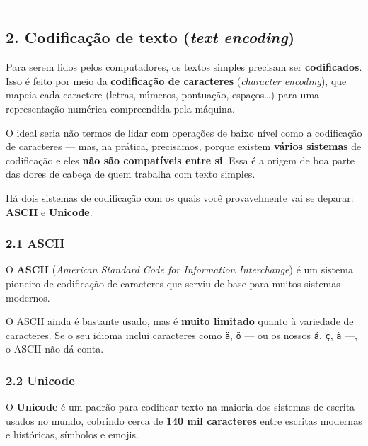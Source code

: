 \documentclass[
  brazilian,
  11pt,
]{article}
\let\oldtexttt\texttt
\renewcommand{\texttt}[1]{{\color{inlink}\oldtexttt{#1}}}
\begin{document}
\begin{center}\rule{0.5\linewidth}{0.5pt}\end{center}

\subsection{\texorpdfstring{2. Codificação de texto (\emph{text
encoding})}{2. Codificação de texto (text encoding)}}\label{codificauxe7uxe3o-de-texto-text-encoding}

Para serem lidos pelos computadores, os textos simples precisam ser
\textbf{codificados}. Isso é feito por meio da \textbf{codificação de
caracteres} (\emph{character encoding}), que mapeia cada caractere
(letras, números, pontuação, espaços\ldots) para uma representação
numérica compreendida pela máquina.

O ideal seria não termos de lidar com operações de baixo nível como a
codificação de caracteres --- mas, na prática, precisamos, porque
existem \textbf{vários sistemas} de codificação e eles \textbf{não são
compatíveis entre si}. Essa é a origem de boa parte das dores de cabeça
de quem trabalha com texto simples.

Há dois sistemas de codificação com os quais você provavelmente vai se
deparar: \textbf{ASCII} e \textbf{Unicode}.

\subsubsection{2.1 ASCII}\label{ascii}

O \textbf{ASCII} (\emph{American Standard Code for Information
Interchange}) é um sistema pioneiro de codificação de caracteres que
serviu de base para muitos sistemas modernos.

O ASCII ainda é bastante usado, mas é \textbf{muito limitado} quanto à
variedade de caracteres. Se o seu idioma inclui caracteres como
\texttt{ä}, \texttt{ö} --- ou os nossos \texttt{á}, \texttt{ç},
\texttt{ã} ---, o ASCII não dá conta.

\subsubsection{2.2 Unicode}\label{unicode}

O \textbf{Unicode} é um padrão para codificar texto na maioria dos
sistemas de escrita usados no mundo, cobrindo cerca de \textbf{140 mil
caracteres} entre escritas modernas e históricas, símbolos e emojis.
\end{document}

